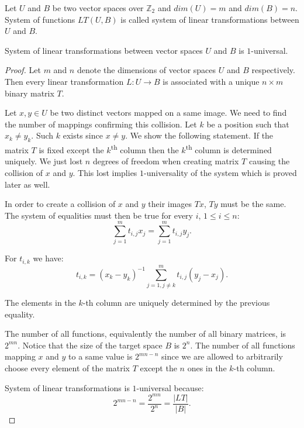 \begin{definition}
\label{definition-system-of-linear-transformations}
Let $U$ and $B$ be two vector spaces over $\mathbb{Z}_2$ and $dim(U) = m$ and $dim(B) = n$. System of functions $LT(U, B)$ is called system of linear transformations between $U$ and $B$.
\end{definition}
\begin{remark}
\label{remark-system-of-linear-transformations}
System of linear transformations between vector spaces $U$ and $B$ is $1$-universal.
\end{remark}
\begin{proof}
Let $m$ and $n$ denote the dimensions of vector spaces $U$ and $B$ respectively. Then every linear transformation $L: U \rightarrow B$ is associated with a unique $n \times m$ binary matrix $T$. 

Let $x, y \in U$ be two distinct vectors mapped on a same image. We need to find the number of mappings confirming this collision. Let $k$ be a position such that $x_k \neq y_k$. Such $k$ exists since $x \neq y$. We show the following statement. If the matrix $T$ is fixed except the $k$\textsuperscript{th} column then the $k$\textsuperscript{th} column is determined uniquely. We just lost $n$ degrees of freedom when creating matrix $T$ causing the collision of $x$ and $y$. This lost implies $1$-universality of the system which is proved later as well.

In order to create a collision of $x$ and $y$ their images $Tx$, $Ty$ must be the same. The system of equalities must then be true for every $i$, $1 \leq i \leq n$:
\[
\displaystyle\sum_{j = 1}^{m}t_{i, j}x_j = \displaystyle\sum_{j = 1}^{m}t_{i, j}y_j \text{.}
\]

For $t_{i, k}$ we have:
\[
t_{i, k} = (x_k - y_k)^{-1}\displaystyle\sum_{j = 1, j \neq k}^{m}t_{i, j}(y_j - x_j) \text{.}
\]

The elements in the $k$-th column are uniquely determined by the previous equality. 

The number of all functions, equivalently the number of all binary matrices, is $2^{mn}$. Notice that the size of the target space $B$ is $2^n$. The number of all functions mapping $x$ and $y$ to a same value is $2^{mn - n}$ since we are allowed to arbitrarily choose every element of the matrix $T$ except the $n$ ones in the $k$-th column. 

System of linear transformations is $1$-universal because:
\[
2^{mn - n} = \frac{2^{mn}}{2^n} = \frac{|LT|}{|B|} \text{.}
\]
\end{proof}

